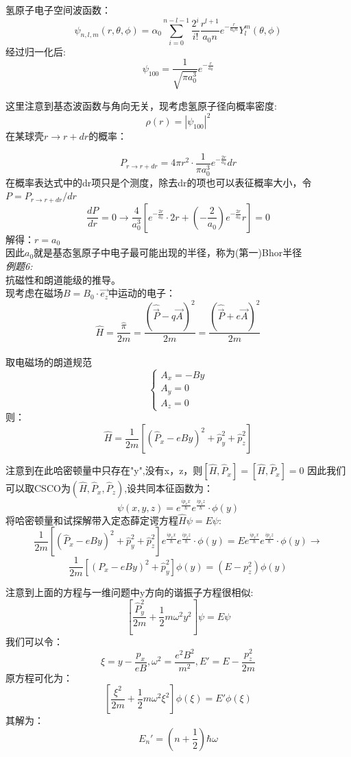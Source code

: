 \documentclass[UTF8]{ctexart}
\begin{document}
氢原子电子空间波函数：
\[
    \psi_{n,l,m}(r,\theta,\phi) = \alpha_0\sum_{i=0}^{n-l-1}\frac{2^i}{i!}\frac{r^{l+1}}{a_0 n} e^{-\frac{r}{a_0 n}} Y_l^m(\theta,\phi)
\]
经过归一化后:
\[
    \psi_{100} = \frac{1}{\sqrt{\pi a_0^3}}e^{-\frac{r}{a_0}}
\]

这里注意到基态波函数与角向无关，现考虑氢原子径向概率密度:
\[
    \rho(r) = |\psi_{100}|^2
\]
在某球壳$r\rightarrow r+dr$的概率：

\[
    P_{r\rightarrow r+dr}=4\pi r^2\cdot \frac{1}{\pi a_0^3}e^{-\frac{2r}{a_0}} dr
\]
在概率表达式中的dr项只是个测度，除去dr的项也可以表征概率大小，令$P=P_{r\rightarrow r+dr}/dr$
\[
    \frac{dP}{dr} = 0
    \rightarrow \frac{4}{a_0^3}[e^{-\frac{2r}{a_0}}\cdot 2r + (-\frac{2}{a_0})e^{-\frac{2r}{a_0}}r]=0
\]
解得：$r=a_0$\\
因此$a_0$就是基态氢原子中电子最可能出现的半径，称为(第一)Bhor半径
\\

\emph{例题6:}\\
抗磁性和朗道能级的推导。\\
现考虑在磁场$B=B_0 \cdot \vec{e_z}$中运动的电子：
\[
    \hat{H} = \frac{\hat{\pi}}{2m} = \frac{(\hat{\vec{P}}-q\vec{A})^2}{2m} = \frac{(\hat{\vec{P}}+e\vec{A})^2}{2m}
\]\\

取电磁场的朗道规范
\[
    \begin{cases}
        A_x = -By\\
        A_y = 0\\
        A_z = 0
    \end{cases}
\]
则：
\[
    \hat{H}=\frac{1}{2m}[(\hat{P}_x-eBy)^2+\hat{p}_y^2+\hat{p}_z^2]
\]

注意到在此哈密顿量中只存在"y",没有x，z，则$[\hat{H},\hat{P}_x]=[\hat{H},\hat{P}_x]=0$
因此我们可以取CSCO为$(\hat{H},\hat{P}_x,\hat{P}_z)$,设共同本征函数为：
\[
    \psi(x,y,z) = e^{\frac{i p_x x}{\hbar}} e^{\frac{i p_z z}{\hbar}}\cdot \phi(y)
\]
将哈密顿量和试探解带入定态薛定谔方程$\hat{H}\psi = E \psi$:
\[
    \frac{1}{2m}[(\hat{P}_x-eBy)^2+\hat{p}_y^2+\hat{p}_z^2]e^{\frac{i p_x x}{\hbar}} e^{\frac{i p_z z}{\hbar}}\cdot \phi(y) = E e^{\frac{i p_x x}{\hbar}} e^{\frac{i p_z z}{\hbar}}\cdot \phi(y)
    \rightarrow
\]
\[
    \frac{1}{2m}[(P_x-eBy)^2+\hat{p}_y^2]\phi(y) = (E-p_z^2)\phi(y)
\]

注意到上面的方程与一维问题中y方向的谐振子方程很相似:
\[
    [\frac{\hat{P}_y^2}{2m}+\frac{1}{2}m\omega^2y^2]\psi = E\psi
\]
我们可以令：
\[
    \xi = y-\frac{p_x}{eB},\omega^2 = \frac{e^2B^2}{m^2},E' = E - \frac{p_z^2}{2m}
\]
原方程可化为：
\[
    [\frac{\xi^2}{2m}+\frac{1}{2}m\omega^2\xi^2]\phi(\xi) = E'\phi(\xi)
\]
其解为：
\[
    E_n' = (n+\frac{1}{2})\hbar \omega
\]
\end{document}
